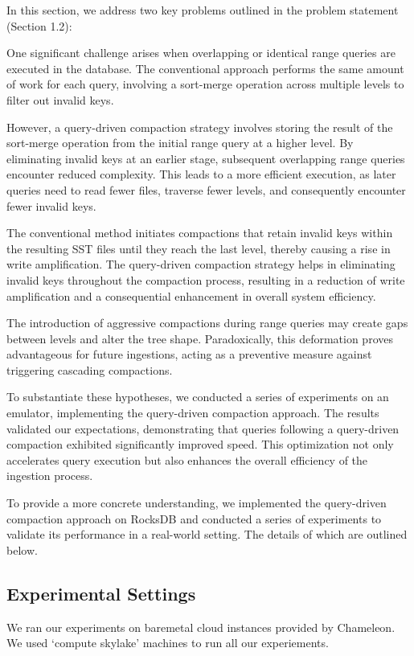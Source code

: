 In this section, we address two key problems outlined in the problem statement (Section 1.2):

 One significant challenge arises when overlapping or identical range queries are executed in
the database. The conventional approach performs the same amount of work for each query, involving a sort-merge operation 
across multiple levels to filter out invalid keys.

However, a query-driven compaction strategy involves storing the result of the sort-merge operation from the initial 
range query at a higher level. By eliminating invalid keys at an earlier stage, subsequent overlapping range queries 
encounter reduced complexity. This leads to a more efficient execution, as later queries need to read fewer files, 
traverse fewer levels, and consequently encounter fewer invalid keys.

 The conventional method initiates compactions that retain invalid keys within
the resulting SST files until they reach the last level, thereby causing a rise in write amplification. The query-driven 
compaction strategy helps in eliminating invalid keys throughout the compaction process, resulting in a reduction of 
write amplification and a consequential enhancement in overall system efficiency.

The introduction of aggressive compactions during range queries may create gaps between levels and alter the tree shape. 
Paradoxically, this deformation proves advantageous for future ingestions, acting as a preventive measure against 
triggering cascading compactions.

To substantiate these hypotheses, we conducted a series of experiments on an emulator, implementing the query-driven 
compaction approach. The results validated our expectations, demonstrating that queries following a query-driven 
compaction exhibited significantly improved speed. This optimization not only accelerates query execution but also 
enhances the overall efficiency of the ingestion process.

 To provide a more concrete understanding, we implemented the query-driven compaction
approach on RocksDB and conducted a series of experiments to validate its performance in a real-world setting. The 
details of which are outlined below.

\subsection{Experimental Settings}
We ran our experiments on baremetal cloud instances provided by Chameleon. We used `compute skylake' machines to run all 
our experiements.

